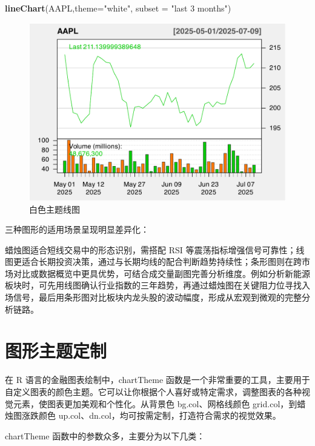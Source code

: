 \documentclass[]{ctexbook}
\newenvironment{Shaded}{\begin{snugshade}}{\end{snugshade}}
\newcommand{\AttributeTok}[1]{\textcolor[rgb]{0.13,0.29,0.53}{#1}}
\newcommand{\FunctionTok}[1]{\textcolor[rgb]{0.13,0.29,0.53}{\textbf{#1}}}
\newcommand{\NormalTok}[1]{#1}
\newcommand{\StringTok}[1]{\textcolor[rgb]{0.31,0.60,0.02}{#1}}
\begin{document}
\begin{Shaded}
\begin{Highlighting}[]
\FunctionTok{lineChart}\NormalTok{(AAPL,}\AttributeTok{theme=}\StringTok{"white"}\NormalTok{, }\AttributeTok{subset =} \StringTok{"last 3 months"}\NormalTok{)}
\end{Highlighting}
\end{Shaded}

\begin{figure}
\includegraphics[width=0.9\linewidth]{quantmod_files/figure-latex/lineWhite-1} \caption{白色主题线图}\label{fig:lineWhite}
\end{figure}

三种图形的适用场景呈现明显差异化：

蜡烛图适合短线交易中的形态识别，需搭配 RSI 等震荡指标增强信号可靠性；线图更适合长期投资决策，通过与长期均线的配合判断趋势持续性；条形图则在跨市场对比或数据概览中更具优势，可结合成交量副图完善分析维度。例如分析新能源板块时，可先用线图确认行业指数的三年趋势，再通过蜡烛图在关键阻力位寻找入场信号，最后用条形图对比板块内龙头股的波动幅度，形成从宏观到微观的完整分析链路。

\section{图形主题定制}\label{ux56feux5f62ux4e3bux9898ux5b9aux5236}

在 R 语言的金融图表绘制中，chartTheme 函数是一个非常重要的工具，主要用于自定义图表的颜色主题。它可以让你根据个人喜好或特定需求，调整图表的各种视觉元素，使图表更加美观和个性化。从背景色 bg.col、网格线颜色 grid.col，到蜡烛图涨跌颜色 up.col、dn.col，均可按需定制，打造符合需求的视觉效果。

chartTheme 函数中的参数众多，主要分为以下几类：
\end{document}
